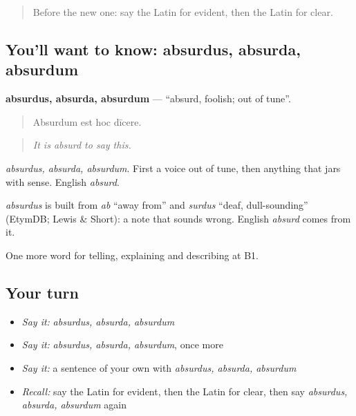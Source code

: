 \label{lesson:LA-C360-absurdus}



\begin{quote}
Before the new one: say the Latin for evident, then the Latin for clear.
\end{quote}

\subsection*{You'll want to know: absurdus, absurda, absurdum}
\textbf{absurdus, absurda, absurdum} — \textquotedblleft{}absurd, foolish; out of tune\textquotedblright{}.

\begin{quote}
Absurdum est hoc dīcere.
\end{quote}

\begin{quote}
\emph{It is absurd to say this.}
\end{quote}

\emph{absurdus, absurda, absurdum}. First a voice out of tune, then anything that jars with sense. English \emph{absurd}.

\begin{cousinweb}
\emph{absurdus} is built from \emph{ab} \textquotedblleft{}away from\textquotedblright{} and \emph{surdus} \textquotedblleft{}deaf, dull-sounding\textquotedblright{} (EtymDB; Lewis \& Short): a note that sounds wrong. English \emph{absurd} comes from it.
\end{cousinweb}

\begin{grammarlens}[title={What you've built}]
One more word for telling, explaining and describing at B1.
\end{grammarlens}

\subsection*{Your turn}
\begin{itemize}
\raggedright
  \item \emph{Say it:} \emph{absurdus, absurda, absurdum}
  \item \emph{Say it:} \emph{absurdus, absurda, absurdum}, once more
  \item \emph{Say it:} a sentence of your own with \emph{absurdus, absurda, absurdum}
  \item \emph{Recall:} say the Latin for evident, then the Latin for clear, then say \emph{absurdus, absurda, absurdum} again
\end{itemize}

